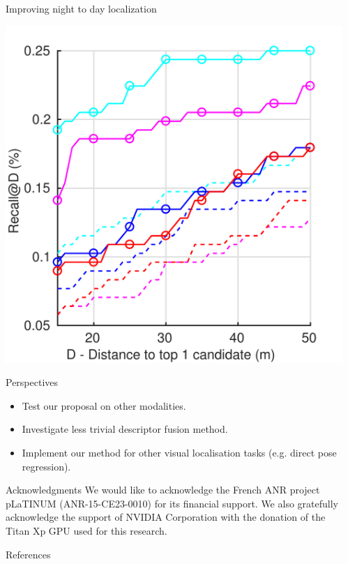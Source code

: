 \documentclass[final]{beamer}
\newlength{\sepwidth}
\newlength{\colwidth}
\newcommand{\separatorcolumn}{\begin{column}{\sepwidth}\end{column}}
\begin{document}
\begin{frame}[t]
\begin{columns}[t]
\begin{column}{\colwidth}
\begin{block}{Improving night to day localization}
\begin{minipage}{0.49\linewidth}
			\includegraphics[width=\linewidth]{vect/res/nightft}
		\end{minipage}		
  \end{block}

  \begin{alertblock}{Perspectives}
	\begin{itemize}
		\item Test our proposal on other modalities.
		\item Investigate less trivial descriptor fusion method.
		\item Implement our method for other visual localisation tasks (e.g. direct pose regression).
	\end{itemize}
  \end{alertblock}  

  \begin{block}{Acknowledgments}
	We would like to acknowledge the French ANR project pLaTINUM (ANR-15-CE23-0010) for its financial support. We also gratefully acknowledge the support of NVIDIA Corporation with the donation of the Titan Xp GPU used for this research.
  \end{block}
  
  \begin{block}{References}
    \footnotesize{}
  \end{block}
\end{column}

\separatorcolumn
\end{columns}
\end{frame}
\end{document}
